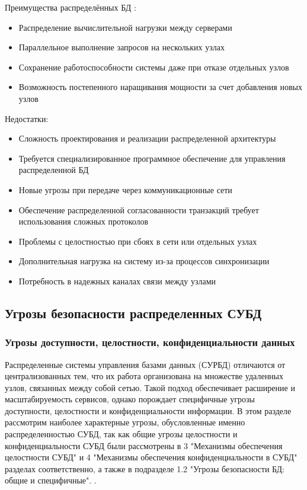 Преимущества распределённых БД \autocite{DDBMSIndusEdition}:

\begin{itemize}
    \item Распределение вычислительной нагрузки между серверами
    \item Параллельное выполнение запросов на нескольких узлах
    \item Сохранение работоспособности системы даже при отказе отдельных узлов
    \item Возможность постепенного наращивания мощности за счет добавления новых узлов  
\end{itemize}

Недостатки:

\begin{itemize}
        \item Сложность проектирования и реализации распределенной архитектуры
        \item Требуется специализированное программное обеспечение для управления распределенной БД
        \item Новые угрозы при передаче через коммуникационные сети
        \item Обеспечение распределенной согласованности транзакций требует использования сложных протоколов
        \item Проблемы с целостностью при сбоях в сети или отдельных узлах
        \item Дополнительная нагрузка на систему из-за процессов синхронизации
        \item Потребность в надежных каналах связи между узлами
\end{itemize}

\subsection{Угрозы безопасности распределенных СУБД}

\subsubsection{Угрозы доступности, целостности, конфиденциальности данных}
Распределенные системы управления базами данных (СУРБД) отличаются от централизованных тем, что их работа организована на множестве удаленных узлов, 
связанных между собой сетью. Такой подход обеспечивает расширение и масштабируемость сервисов, однако порождает специфичные угрозы доступности, 
целостности и конфиденциальности информации. В этом разделе рассмотрим наиболее характерные угрозы, обусловленные именно распределенностью СУБД, 
так как общие угрозы целостности и конфиденциальности СУБД были рассмотрены в 3 "Механизмы обеспечения целостности СУБД" и 4 "Механизмы обеспечения конфиденциальности в СУБД"  разделах соответственно, а также в подразделе 1.2 "Угрозы безопасности БД: общие и специфичные". \autocite{Tanenbaum}.

